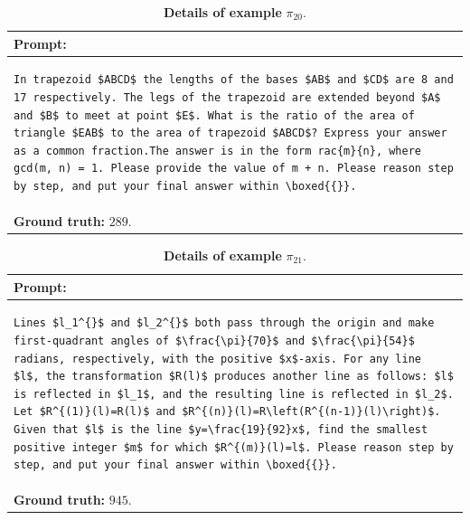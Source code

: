 \begin{table}[htbp]
\centering
\caption{\textbf{Details of example} $\pi_{20}$.}
\begin{tabular}{p{}}
\toprule
\textbf{Prompt:} \\
\midrule
\footnotesize
\begin{lstlisting}[breaklines=true, basicstyle=\ttfamily, aboveskip=-1.0em, belowskip=0pt, breakindent=0pt]
In trapezoid $ABCD$ the lengths of the bases $AB$ and $CD$ are 8 and 17 respectively. The legs of the trapezoid are extended beyond $A$ and $B$ to meet at point $E$. What is the ratio of the area of triangle $EAB$ to the area of trapezoid $ABCD$? Express your answer as a common fraction.The answer is in the form rac{m}{n}, where gcd(m, n) = 1. Please provide the value of m + n. Please reason step by step, and put your final answer within \boxed{{}}.
\end{lstlisting} \\
\midrule
\textbf{Ground truth:} $289$. \\
\bottomrule
\end{tabular}
\end{table}


\begin{table}[htbp]
\centering
\caption{\textbf{Details of example} $\pi_{21}$.}
\begin{tabular}{p{}}
\toprule
\textbf{Prompt:} \\
\midrule
\footnotesize
\begin{lstlisting}[breaklines=true, basicstyle=\ttfamily, aboveskip=-1.0em, belowskip=0pt, breakindent=0pt]
Lines $l_1^{}$ and $l_2^{}$ both pass through the origin and make first-quadrant angles of $\frac{\pi}{70}$ and $\frac{\pi}{54}$ radians, respectively, with the positive $x$-axis. For any line  $l$, the transformation $R(l)$ produces another line as follows: $l$ is reflected in $l_1$, and the resulting line is reflected in $l_2$. Let $R^{(1)}(l)=R(l)$ and $R^{(n)}(l)=R\left(R^{(n-1)}(l)\right)$. Given that $l$ is the line $y=\frac{19}{92}x$, find the smallest positive integer $m$ for which $R^{(m)}(l)=l$. Please reason step by step, and put your final answer within \boxed{{}}.
\end{lstlisting} \\
\midrule
\textbf{Ground truth:} $945$. \\
\bottomrule
\end{tabular}
\end{table}


